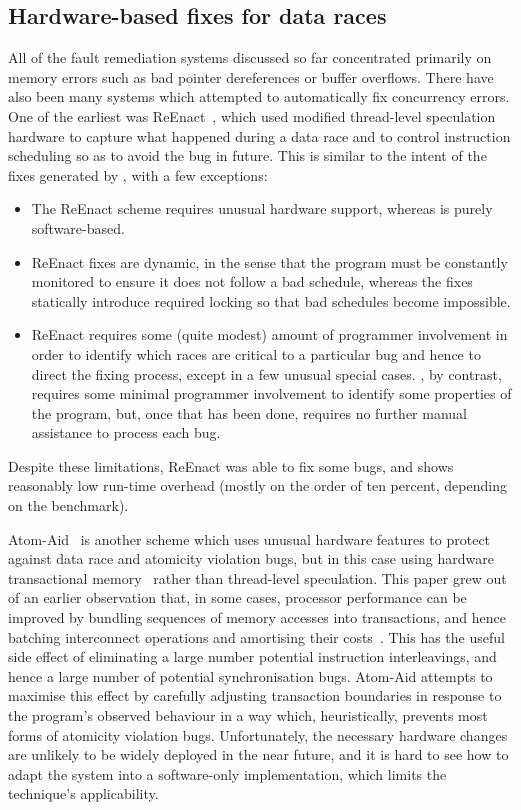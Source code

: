 \subsection{Hardware-based fixes for data races}
All of the fault remediation systems discussed so far concentrated
primarily on memory errors such as bad pointer dereferences or buffer
overflows.  There have also been many systems which attempted to
automatically fix concurrency errors.  One of the earliest was
ReEnact~\cite{Prvulovic2003a}, which used modified thread-level
speculation hardware to capture what happened during a data race and
to control instruction scheduling so as to avoid the bug in future.
This is similar to the intent of the fixes generated by {\technique},
with a few exceptions:
\begin{itemize}
\item The ReEnact scheme requires unusual hardware support, whereas
  {\technique} is purely software-based.
\item ReEnact fixes are dynamic, in the sense that the program must be
  constantly monitored to ensure it does not follow a bad schedule,
  whereas the {\technique} fixes statically introduce required locking
  so that bad schedules become impossible.
\item ReEnact requires some (quite modest) amount of programmer
  involvement in order to identify which races are critical to a
  particular bug and hence to direct the fixing process, except in a
  few unusual special cases.  {\Technique}, by contrast, requires some
  minimal programmer involvement to identify some properties of the
  program, but, once that has been done, requires no further manual
  assistance to process each bug.
\end{itemize}
Despite these limitations, ReEnact was able to fix some bugs, and
shows reasonably low run-time overhead (mostly on the order of ten
percent, depending on the benchmark).

Atom-Aid~\cite{Lucia2009} is another scheme which uses unusual
hardware features to protect against data race and atomicity violation
bugs, but in this case using hardware transactional
memory~\cite{Herlihy1993} rather than thread-level speculation.  This
paper grew out of an earlier observation that, in some cases,
processor performance can be improved by bundling sequences of memory
accesses into transactions, and hence batching interconnect operations
and amortising their costs~\cite{Ceze2007}.  This has the useful side
effect of eliminating a large number potential instruction
interleavings, and hence a large number of potential synchronisation
bugs.  Atom-Aid attempts to maximise this effect by carefully
adjusting transaction boundaries in response to the program's observed
behaviour in a way which, heuristically, prevents most forms of
atomicity violation bugs.  Unfortunately, the necessary hardware
changes are unlikely to be widely deployed in the near future, and it
is hard to see how to adapt the system into a software-only
implementation, which limits the technique's applicability.


